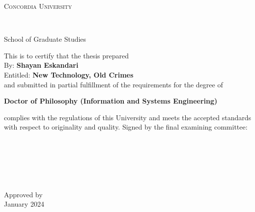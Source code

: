 
\thispagestyle{empty} %

\begin{center}\begin{Large} \textsc{Concordia University} \end{Large} \\
\begin{large} School of Graduate Studies \end{large} \end{center}
\vfill
This is to certify that the thesis prepared\\
By: \tab   \textbf{Shayan Eskandari} \\
Entitled: \tab \textbf{New Technology, Old Crimes}\\
 and submitted in partial fulfillment of the requirements for the degree of
\begin{center}
\textbf{Doctor of Philosophy (Information and Systems Engineering)}
\end{center}
complies with the regulations of this University and meets the
accepted standards with respect to originality and quality.
\vfill
\noindent Signed by the final examining committee: \\[1.3em] %
\hspace*{1cm} \hrulefill {} \\[1.3em]
\hspace*{1cm} \hrulefill {} \\[1.3em]
\hspace*{1cm} \hrulefill {} \\[1.3em]
\hspace*{1cm} \hrulefill {} \\[1.3em]
\hspace*{1cm} \hrulefill {} \\[1.3em]
\hspace*{1cm} \hrulefill {} \\[1.3em]
\vfill
\noindent Approved by \hrulefill \\[1.3em]
 January 2024 \hrulefill \\




